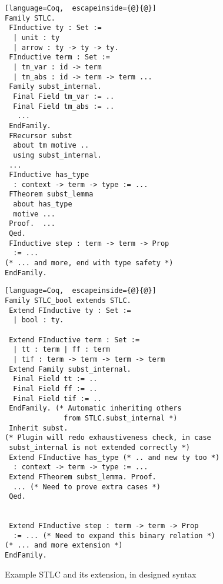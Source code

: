 \begin{figure}
  \begin{minipage}[t]{0.47\linewidth}
\begin{lstlisting}[language=Coq,  escapeinside={@}{@}]
Family STLC.
 FInductive ty : Set :=
  | unit : ty
  | arrow : ty -> ty -> ty.
 FInductive term : Set := 
  | tm_var : id -> term 
  | tm_abs : id -> term -> term ...
 Family subst_internal.
  Final Field tm_var := ..
  Final Field tm_abs := ..
   ...
 EndFamily.
 FRecursor subst
  about tm motive ..
  using subst_internal.
 ...
 FInductive has_type 
  : context -> term -> type := ...
 FTheorem subst_lemma 
  about has_type 
  motive ...
 Proof.  ...
 Qed.
 FInductive step : term -> term -> Prop 
  := ...
(* ... and more, end with type safety *)
EndFamily.
\end{lstlisting}
  \end{minipage}
  \begin{minipage}[t]{0.47\linewidth}
\begin{lstlisting}[language=Coq,  escapeinside={@}{@}]
Family STLC_bool extends STLC.
 Extend FInductive ty : Set :=
  | bool : ty.

 Extend FInductive term : Set := 
  | tt : term | ff : term 
  | tif : term -> term -> term -> term
 Extend Family subst_internal.
  Final Field tt := ..
  Final Field ff := ..
  Final Field tif := ..
 EndFamily. (* Automatic inheriting others 
              from STLC.subst_internal *)
 Inherit subst.
(* Plugin will redo exhaustiveness check, in case 
 subst_internal is not extended correctly *)
 Extend FInductive has_type (* .. and new ty too *)
  : context -> term -> type := ...
 Extend FTheorem subst_lemma. Proof.
  ... (* Need to prove extra cases *)
 Qed.


 Extend FInductive step : term -> term -> Prop 
  := ... (* Need to expand this binary relation *)
(* ... and more extension *)
EndFamily.
\end{lstlisting}
\end{minipage}

\caption{Example STLC and its extension, in designed syntax}\label{fig:STLC-example2}
\end{figure}

\fi